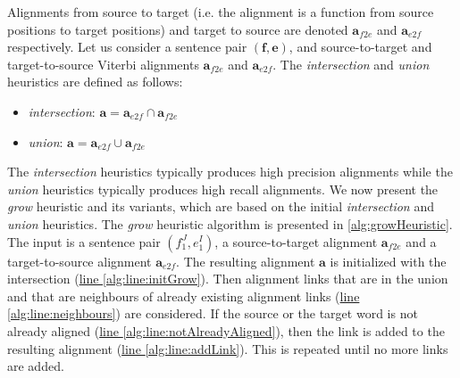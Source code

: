 Alignments from source to target (i.e. the alignment is
a function from source positions to target positions)
and target to source are denoted
$\bm{a}_{f2e}$ and $\bm{a}_{e2f}$ respectively.
Let us consider a sentence pair $(\bm{f}, \bm{e})$, and
source-to-target and target-to-source Viterbi alignments
$\bm{a}_{f2e}$ and $\bm{a}_{e2f}$.
The \emph{intersection} and \emph{union} heuristics
are defined as follows:
%
\begin{itemize}
  \item \emph{intersection}: $\bm{a} = \bm{a}_{e2f} \cap \bm{a}_{f2e}$
  \item \emph{union}: $\bm{a} = \bm{a}_{e2f} \cup \bm{a}_{f2e}$
\end{itemize}
%
The \emph{intersection} heuristics typically produces high precision alignments
while the \emph{union} heuristics typically produces high recall alignments.
We now present the \emph{grow} heuristic and its variants, which are based
on the initial \emph{intersection} and \emph{union} heuristics.
The \emph{grow} heuristic algorithm is presented in
\autoref{alg:growHeuristic}. The input is a sentence
pair $(f_1^J, e_1^I)$, a source-to-target
alignment $\bm{a}_{f2e}$ and a target-to-source alignment
$\bm{a}_{e2f}$. The resulting alignment $\bm{a}$ is initialized
with the
intersection (\hyperlink{alg:line:initGrow}{line \ref{alg:line:initGrow}}).
Then alignment links that are in the union and that are neighbours of already existing
alignment links (\hyperlink{alg:line:neighbours}{line \ref{alg:line:neighbours}})
are considered. If the source or the target word is not already
aligned (\hyperlink{alg:line:notAlreadyAligned}{line \ref{alg:line:notAlreadyAligned}}),
then the link is added to the resulting
alignment (\hyperlink{alg:line:addLink}{line \ref{alg:line:addLink}}).
This is repeated until no more links are added.
%
